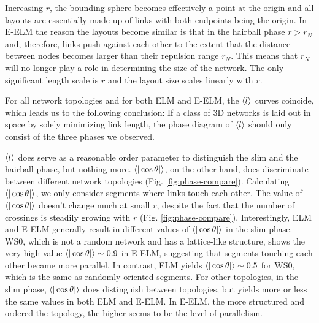 \documentclass[nofootinbib,preprint,endfloats]{revtex4} %
\begin{document}
Increasing $r$, the bounding sphere becomes effectively a point at the origin and all layouts are essentially made up of links with both endpoints being the origin. 
In E-ELM the reason the layouts become similar is that in the hairball phase $r > r_N$ and, therefore, links push against each other to the extent that the distance between nodes becomes larger than their repulsion range $r_N$. This means that $r_N$ will no longer play a role in determining the size of the network. The only significant length scale is $r$ and the layout size scales linearly with $r$. 

For all network topologies and for both ELM and E-ELM, the $\left<l\right>$ curves coincide, which leads us to the following conclusion: 
If a class of 3D networks is laid out in space by solely minimizing link length, the phase diagram of $\left<l\right>$ should only consist of the three phases we observed. 

$\left<l\right>$ does serve as a reasonable order parameter to distinguish the slim and the hairball phase, but nothing more. 
$\be{|\cos\theta|}$, on the other hand, does discriminate between different network topologies (Fig. \ref{fig:phase-compare}). 
Calculating $\be{|\cos\theta|}$, we only consider segments where links touch each other. 
The value of $\be{|\cos\theta|}$ doesn't change much at small $r$, despite the fact that the number of crossings is steadily growing with $r$ (Fig. \ref{fig:phase-compare}).
Interestingly, ELM and E-ELM  generally result in different values of $\be{|\cos\theta|}$ in the slim phase. 
WS0, which is not a random network and has a lattice-like structure, shows the very high value $\be{|\cos\theta|} \sim 0.9 $ in E-ELM, suggesting that segments touching each other became more parallel. In contrast, ELM yields  $\be{|\cos\theta|} \sim 0.5 $ for WS0, which is the same as randomly oriented segments. For other topologies, in the slim phase, $\be{|\cos\theta|} $ does distinguish between topologies, but yields more or less the same values in both ELM and E-ELM. In E-ELM, the more structured and ordered the topology, the higher seems to be the level of parallelism.  
\end{document}
